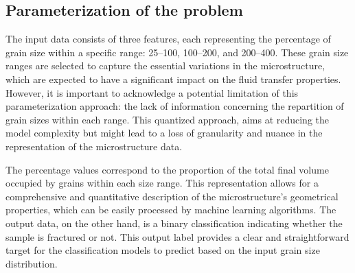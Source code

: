 \documentclass[10pt]{article}
\begin{document}
\begin{multicols}{2}
\subsection{Parameterization of the problem}

The input data consists of three features, each representing the percentage of grain size within a specific range: 25--100, 100--200, and 200--400. These grain size ranges are selected to capture the essential variations in the microstructure, which are expected to have a significant impact on the fluid transfer properties. However, it is important to acknowledge a potential limitation of this parameterization approach: the lack of information concerning the repartition of grain sizes within each range. This quantized approach, aims at reducing the model complexity but might lead to a loss of granularity and nuance in the representation of the microstructure data.

The percentage values correspond to the proportion of the total final volume occupied by grains within each size range. This representation allows for a comprehensive and quantitative description of the microstructure's geometrical properties, which can be easily processed by machine learning algorithms. The output data, on the other hand, is a binary classification indicating whether the sample is fractured or not. This output label provides a clear and straightforward target for the classification models to predict based on the input grain size distribution.


\end{multicols}
\end{document}
